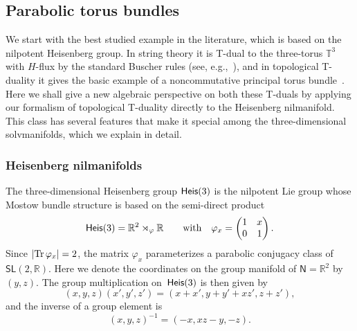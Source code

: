\documentclass[pdftex]{sigma}
\numberwithin{equation}{section}
\newcommand{\sfN}{\mathsf{N}}
\newcommand{\sfSL}{\mathsf{SL}}
\newcommand{\Heis}{{\sf Heis}}
\newcommand{\real}{{\mathbb R}} %
\newcommand{\torus}{{\mathbb T}} %
\newcommand{\Tr}[1]{{\rm Tr}\,#1}
\begin{document}
\subsection{Parabolic torus bundles}\label{sec:parabolicbundles}

We start with the best
studied example in the literature, which is based on the nilpotent Heisenberg
group. In string theory it is T-dual to the three-torus $\torus^3$ with $H$-flux by
the standard Buscher rules (see, e.g.,~\cite{Hull2009}), and in
topological T-duality it gives the basic example of a noncommutative
principal torus
bundle~\cite{Echterhoff2009,Hannabuss2010, Mathai2004}. Here we shall give a new algebraic
perspective on
both these T-duals by applying our formalism of topological T-duality
directly to the Heisenberg nilmanifold. This class has several
features that make it special among the three-dimensional
solvmanifolds, which we explain in detail.

\subsubsection*{Heisenberg nilmanifolds}

The three-dimensional Heisenberg group $\Heis(3)$ is the nilpotent
Lie group whose Mostow bundle
structure is based on the semi-direct product
\[
\Heis(3) = \real^2\rtimes_\varphi\real \qquad \mbox{with} \quad
\varphi_x = \left( \begin{matrix}
1 & x \\
0 & 1
\end{matrix} \right) .
\]
Since $|\Tr\varphi_x|=2$, the matrix $\varphi_x$ parameterizes a
parabolic conjugacy class of $\sfSL(2,\real)$.
Here we denote the coordinates on the group manifold of $\sfN=\real^2$ by
$(y,z)$. The group multiplication on~$\Heis(3)$ is then given by
\[
(x,y,z) (x',y',z' ) = (x+x',y+y'+x z', z+z' ) ,
\]
and the inverse of a group element is
\[
(x,y,z)^{-1}= (-x,x z-y,-z) .
\]
\end{document}
